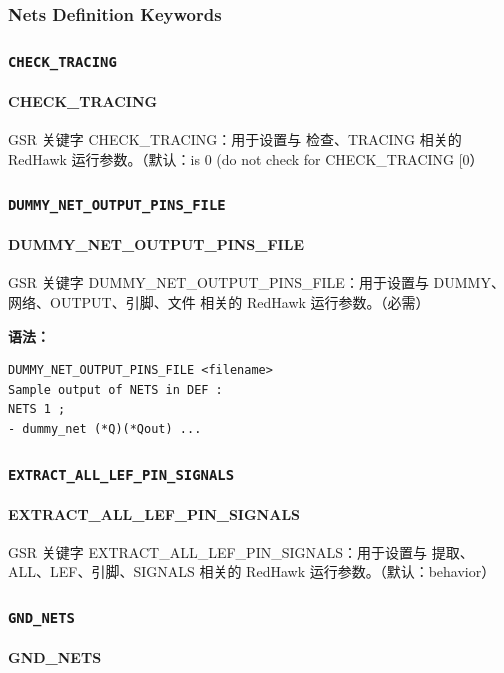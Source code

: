 \subsubsection*{Nets Definition Keywords}

\subsubsection{\texttt{CHECK_TRACING}}
\paragraph*{CHECK_TRACING}

GSR 关键字 CHECK_TRACING：用于设置与 检查、TRACING 相关的 RedHawk 运行参数。（默认：is 0 (do not check for CHECK_TRACING [0）

\subsubsection{\texttt{DUMMY_NET_OUTPUT_PINS_FILE}}
\paragraph*{DUMMY_NET_OUTPUT_PINS_FILE}

GSR 关键字 DUMMY_NET_OUTPUT_PINS_FILE：用于设置与 DUMMY、网络、OUTPUT、引脚、文件 相关的 RedHawk 运行参数。（必需）

\textbf{语法：}
\begin{lstlisting}
DUMMY_NET_OUTPUT_PINS_FILE <filename>
Sample output of NETS in DEF :
NETS 1 ;
- dummy_net (*Q)(*Qout) ...
\end{lstlisting}

\subsubsection{\texttt{EXTRACT_ALL_LEF_PIN_SIGNALS}}
\paragraph*{EXTRACT_ALL_LEF_PIN_SIGNALS}

GSR 关键字 EXTRACT_ALL_LEF_PIN_SIGNALS：用于设置与 提取、ALL、LEF、引脚、SIGNALS 相关的 RedHawk 运行参数。（默认：behavior）

\subsubsection{\texttt{GND_NETS}}
\paragraph*{GND_NETS}

